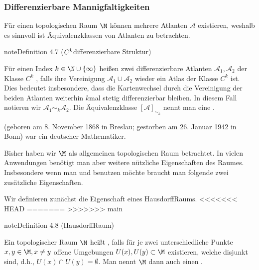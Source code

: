 \documentclass[letterpaper,10pt,english]{jupyterBook}
\begin{document}
\subsubsection{Differenzierbare Mannigfaltigkeiten}
\label{\detokenize{manifolds/manifolds_prelim:differenzierbare-mannigfaltigkeiten}}
\sphinxAtStartPar
Für einen topologischen Raum \(\M\) können mehrere Atlanten \(\mathcal{A}\) existieren, weshalb es sinnvoll ist Äquivalenzklassen von Atlanten zu betrachten.
\label{manifolds/manifolds_prelim:definition-9}
\begin{sphinxadmonition}{note}{Definition 4.7 (\protect\(C^k\protect\)\sphinxhyphen{}differenzierbare Struktur)}



\sphinxAtStartPar
Für einen Index \(k\in \N \cup \{\infty\}\) heißen zwei differenzierbare Atlanten \(\mathcal{A}_1, \mathcal{A}_2\) der Klasse \(C^k\) , falls ihre Vereinigung \(\mathcal{A}_1\cup \mathcal{A}_2\) wieder ein Atlas der Klasse \(C^k\) ist.
Dies bedeutet insbesondere, dass die Kartenwechsel durch die Vereinigung der beiden Atlanten weiterhin \(k\)\sphinxhyphen{}mal stetig differenzierbar bleiben.
In diesem Fall notieren wir \(\mathcal{A}_1\sim_k \mathcal{A}_2\).
Die Äquivalenzklasse \([\mathcal{A}]_{\sim_k}\) nennt man eine .
\end{sphinxadmonition}

\begin{sphinxShadowBox}
\sphinxstylesidebartitle{}

\sphinxAtStartPar
{} (geboren am 8. November 1868 in Breslau; gestorben am 26. Januar 1942 in Bonn) war ein deutscher Mathematiker.
\end{sphinxShadowBox}

\sphinxAtStartPar
Bisher haben wir \(\M\) als allgemeinen topologischen Raum betrachtet.
In vielen Anwendungen benötigt man aber weitere nützliche Eigenschaften des Raumes.
Insbesondere wenn man  und  benutzen möchte braucht man folgende zwei zusätzliche Eigenschaften.

\sphinxAtStartPar
Wir definieren zunächst die Eigenschaft eines Hausdorff\sphinxhyphen{}Raums.
<<<<<<< HEAD
\label{manifolds/manifolds_prelim:def:hausdorffraum}
=======
\label{manifolds/manifolds_prelim:definition-10}
>>>>>>> main
\begin{sphinxadmonition}{note}{Definition 4.8 (Hausdorff\sphinxhyphen{}Raum)}



\sphinxAtStartPar
Ein topologischer Raum \(\M\) heißt , falls für je zwei unterschiedliche Punkte \(x,y\in \M, x\neq y\) offene Umgebungen \(U(x), U(y) \subset \M\) existieren, welche disjunkt sind, d.h., \(U(x)\cap U(y) = \emptyset\).
Man nennt \(\M\) dann auch einen .
\end{sphinxadmonition}
\end{document}
